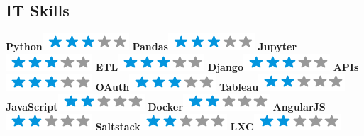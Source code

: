 \documentclass[]{friggeri-cv}
\begin{document}
\begin{aside}
  \section{IT Skills}
    \textbf{Python}\includegraphics[scale=0.40]{img/3stars.png}
    \textbf{Pandas}\includegraphics[scale=0.40]{img/3stars.png}
    \textbf{Jupyter}\includegraphics[scale=0.40]{img/3stars.png}
    \textbf{ETL}\includegraphics[scale=0.40]{img/3stars.png}
    \textbf{Django}\includegraphics[scale=0.40]{img/3stars.png}
    \textbf{APIs}\includegraphics[scale=0.40]{img/3stars.png}
    \textbf{OAuth}\includegraphics[scale=0.40]{img/3stars.png}
    \textbf{Tableau}\includegraphics[scale=0.40]{img/2stars.png}
    \textbf{JavaScript}\includegraphics[scale=0.40]{img/2stars.png}
    \textbf{Docker}\includegraphics[scale=0.40]{img/2stars.png}
    \textbf{AngularJS}\includegraphics[scale=0.40]{img/2stars.png}
    \textbf{Saltstack}\includegraphics[scale=0.40]{img/2stars.png}
    \textbf{LXC}\includegraphics[scale=0.40]{img/2stars.png}

\end{aside}
\end{document}
